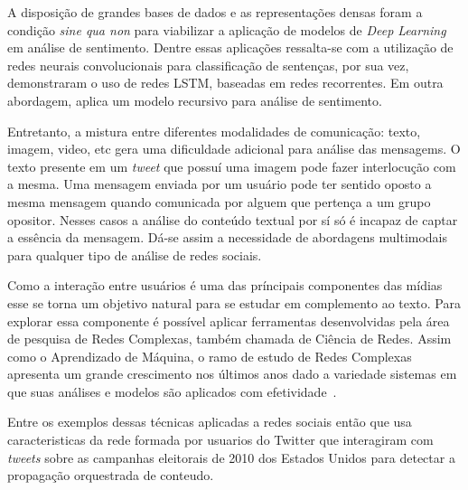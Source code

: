 A disposição de grandes bases de dados e as representações densas foram a
condição \textit{sine qua non} para viabilizar a aplicação de modelos de
\textit{Deep Learning} em análise de sentimento.
Dentre essas aplicações ressalta-se \citet{kim14} com a utilização de redes
neurais convolucionais para classificação de sentenças, por sua vez,
\citet{zhou16} demonstraram o uso de redes LSTM, baseadas em redes recorrentes.
Em outra abordagem, \citet{socher13} aplica um modelo recursivo para análise de
sentimento.

Entretanto, a mistura entre diferentes modalidades de comunicação: texto, imagem,
video, etc gera uma dificuldade adicional para análise das mensagems.
O texto presente em um \textit{tweet} que possuí uma imagem pode fazer
interlocução com a mesma.
Uma mensagem enviada por um usuário pode ter sentido oposto a mesma mensagem
quando comunicada por alguem que pertença a um grupo opositor.
Nesses casos a análise do conteúdo textual por sí só é incapaz de captar a
essência da mensagem.
Dá-se assim a necessidade de abordagens multimodais para qualquer tipo de
análise de redes sociais.

Como a interação entre usuários é uma das príncipais componentes das mídias esse
se torna um objetivo natural para se estudar em complemento ao texto.
Para explorar essa componente é possível aplicar ferramentas desenvolvidas pela
área de pesquisa de Redes Complexas, também chamada de Ciência de Redes.
Assim como o Aprendizado de Máquina, o ramo de estudo de Redes Complexas
apresenta um grande crescimento nos últimos anos dado a variedade sistemas em
que suas análises e modelos são aplicados com efetividade~\cite{albert02}.

Entre os exemplos dessas técnicas aplicadas a redes sociais então
\citet{ratkiewicz11} que usa caracteristicas da rede formada por usuarios do
Twitter que interagiram com \textit{tweets} sobre as campanhas eleitorais de
2010 dos Estados Unidos para detectar a propagação orquestrada de conteudo.




